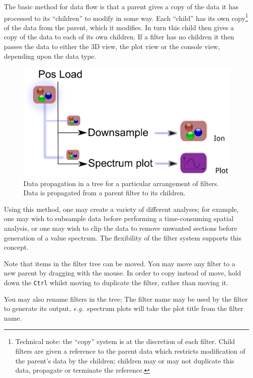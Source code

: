 \documentclass[10pt]{article}
\begin{document}
The basic method for data flow is that a parent gives a copy of the data it has processed to its ``children'' to modify in some way. Each ``child'' has its own copy\footnote{Technical note: the ``copy'' system is at the discretion of each filter. Child filters are given a reference to the parent data which restricts modification of the parent's data by the children; children may or may not duplicate this data, propagate or terminate the reference.} of the data from the parent, which it modifies. In turn this child then gives a copy of the data to each of its own children. If a filter has no children it then passes the data to either the 3D view, the plot view or the console view, depending upon the data type.  

\begin{figure}[ht]
 \centering
 \includegraphics[width=0.85 \textwidth]{./figures/tree-propagate.pdf}
 \caption{Data propagation in a tree for a particular arrangement of filters. Data is propagated from a parent filter to its children.}
\label{fig:datapropagate}
\end{figure}


Using this method, one may create a variety of different analyses; for example, one may wish to subsample data before performing a time-consuming spatial analysis, or one may wish to clip the data to remove unwanted sections before generation of a value spectrum. The flexibility of the filter system supports this concept.

Note that items in the filter tree can be moved. You may move any filter to a new parent by dragging with the mouse. In order to copy instead of move, hold down the \texttt{Ctrl} whilst moving to duplicate the filter, rather than moving it.  

You may also rename filters in the tree; The filter name may be used by the filter to generate its output, \emph{e.g.}\ spectrum plots will take the plot title from the filter name. 
\end{document}
